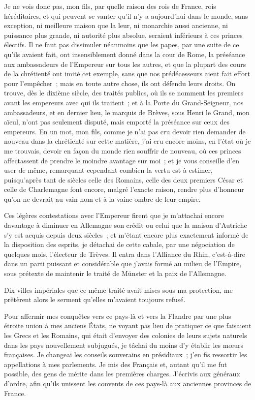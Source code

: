 \documentclass[french,twoside]{book} %
\begin{document}
Je ne vois donc pas, mon fils, par quelle raison des rois de France, rois héréditaires, et qui peuvent se vanter qu’il n’y a aujourd’hui dans le monde, sans exception, ni meilleure maison que la leur, ni monarchie aussi ancienne, ni puissance plus grande, ni autorité plus absolue, seraient inférieurs à ces princes électifs. Il ne faut pas dissimuler néanmoins que les papes, par une suite de ce qu’ils avaient fait, ont insensiblement donné dans la cour de Rome, la préséance aux ambassadeurs de l’Empereur sur tous les autres, et que la plupart des cours de la chrétienté ont imité cet exemple, sans que nos prédécesseurs aient fait effort pour l’empêcher ; mais en toute autre chose, ils ont défendu leurs droits. On trouve, dès le dixième siècle, des traités publics, où ils se nomment les premiers avant les empereurs avec qui ils traitent ; et à la Porte du Grand-Seigneur, nos ambassadeurs, et en dernier lieu, le marquis de Brèves, sous Henri le Grand, mon aïeul, n’ont pas seulement disputé, mais emporté la préséance sur ceux des empereurs. En un mot, mon fils, comme je n’ai pas cru devoir rien demander de nouveau dans la chrétienté sur cette matière, j’ai cru encore moins, en l’état où je me trouvais, devoir en façon du monde rien souffrir de nouveau, où ces princes affectassent de prendre le moindre avantage sur moi ; et je vous conseille d’en user de même, remarquant cependant combien la vertu est à estimer, puisqu’après tant de siècles celle des Romains, celle des deux premiers César et celle de Charlemagne font encore, malgré l’exacte raison, rendre plus d’honneur qu’on ne devrait au vain nom et à la vaine ombre de leur empire.\par
Ces légères contestations avec l’Empereur firent que je m’attachai encore davantage à diminuer en Allemagne son crédit ou celui que la maison d’Autriche s’y est acquis depuis deux siècles ; et m’étant encore plus exactement informé de la disposition des esprits, je détachai de cette cabale, par une négociation de quelques mois, l’électeur de Trèves. Il entra dans l’Alliance du Rhin, c’est-à-dire dans un parti puissant et considérable que j’avais formé au milieu de l’Empire, sous prétexte de maintenir le traité de Münster et la paix de l’Allemagne.\par
Dix villes impériales que ce même traité avait mises sous ma protection, me prêtèrent alors le serment qu’elles m’avaient toujours refusé.\par
Pour affermir mes conquêtes vers ce pays-là et vers la Flandre par une plus étroite union à mes anciens États, ne voyant pas lieu de pratiquer ce que faisaient les Grecs et les Romains, qui était d’envoyer des colonies de leurs sujets naturels dans les pays nouvellement subjugués, je tâchai du moins d’y établir les mœurs françaises. Je changeai les conseils souverains en présidiaux ; j’en fis ressortir les appellations à mes parlements. Je mis des Français et, autant qu’il me fut possible, des gens de mérite dans les premières charges. J’écrivis aux généraux d’ordre, afin qu’ils unissent les convents de ces pays-là aux anciennes provinces de France.\par
\end{document}
